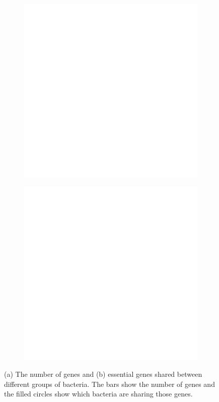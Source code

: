 \documentclass[12pt,letterpaper]{article}
\begin{document}
\begin{figure}
\captionsetup[subfigure]{justification=centering}
\begin{subfigure}{.5\textwidth}
  \centering
  \includegraphics[scale=0.45,page=2]{upsetr.pdf}
  \caption{}
  \label{fig:upsetr-conservation}
\end{subfigure}
\begin{subfigure}{.5\textwidth}
  \centering
  \includegraphics[scale=0.45,page=3]{upsetr.pdf}
  \caption{}
  \label{fig:upsetr-essentiality}
\end{subfigure}
\caption{(a) The number of genes and (b) essential genes shared between different groups of bacteria. The bars show the number of genes and the filled circles show which bacteria are sharing those genes.}
\label{fig:upsetr}
\end{figure}
\end{document}
